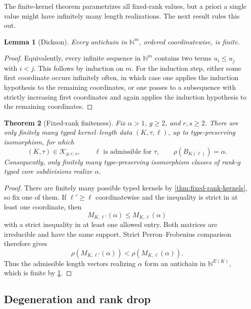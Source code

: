 \documentclass[11pt]{amsart}
\theoremstyle{plain}
\newtheorem{theorem}{Theorem}[section]
\newtheorem{lemma}[theorem]{Lemma}
\theoremstyle{definition}
\theoremstyle{remark}
\begin{document}
The finite-kernel theorem parametrizes all fixed-rank values, but a priori a
single value might have infinitely many length realizations.  The next result
rules this out.

\begin{lemma}[Dickson]\label{lem:dickson}
Every antichain in \(\mathbb N^m\), ordered coordinatewise, is finite.
\end{lemma}

\begin{proof}
Equivalently, every infinite sequence in \(\mathbb N^m\) contains two terms
\(u_i\leq u_j\) with \(i<j\).  This follows by induction on \(m\).  For the
induction step, either some first coordinate occurs infinitely often, in
which case one applies the induction hypothesis to the remaining
coordinates, or one passes to a subsequence with strictly increasing first
coordinates and again applies the induction hypothesis to the remaining
coordinates.
\end{proof}

\begin{theorem}[Fixed-rank finiteness]\label{thm:fixed-rank-finiteness}
Fix \(\alpha>1\), \(g\geq2\), and \(r,s\geq2\).  There are only finitely
many typed kernel--length data \((K,\tau,\ell)\), up to type-preserving
isomorphism, for which
\[
  (K,\tau)\in\mathcal K_{g;r,s},
  \qquad \ell\text{ is admissible for }\tau,
  \qquad
  \rho(B_{K(\ell)})=\alpha.
\]
Consequently, only finitely many type-preserving isomorphism classes of
rank-\(g\) typed core subdivisions realize \(\alpha\).
\end{theorem}

\begin{proof}
There are finitely many possible typed kernels by
\cref{thm:fixed-rank-kernels}, so fix one of them.  If
\(\ell'\geq\ell\) coordinatewise and the inequality is strict in at least one
coordinate, then
\[
  M_{K,\ell'}(\alpha)
  \leq M_{K,\ell}(\alpha)
\]
with a strict inequality in at least one allowed entry.  Both matrices are
irreducible and have the same support.  Strict Perron--Frobenius comparison
therefore gives
\[
  \rho(M_{K,\ell'}(\alpha))
  <\rho(M_{K,\ell}(\alpha)).
\]
Thus the admissible length vectors realizing \(\alpha\) form an antichain
in \(\mathbb N^{E(K)}\), which is finite by \cref{lem:dickson}.
\end{proof}

\subsection{Degeneration and rank drop}
\end{document}
